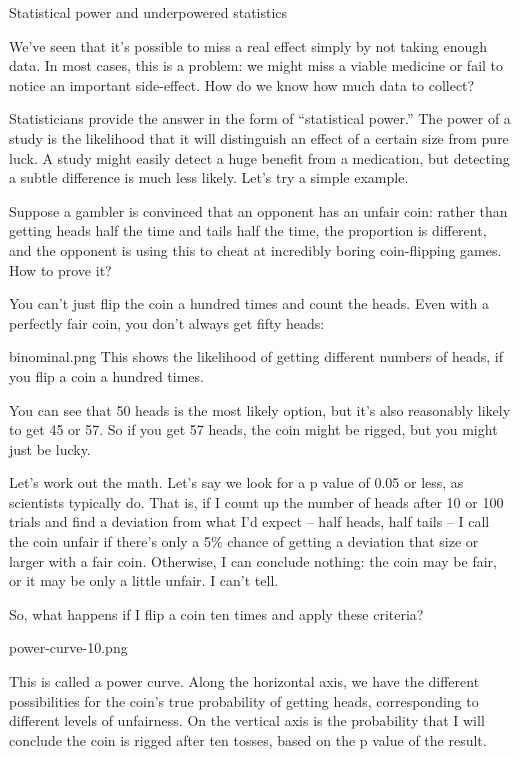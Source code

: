 Statistical power and underpowered statistics


We’ve seen that it’s possible to miss a real effect simply by not taking enough data. In most cases, this is a problem: we might miss a viable medicine or fail to notice an important side-effect. How do we know how much data to collect?

Statisticians provide the answer in the form of “statistical power.” The power of a study is the likelihood that it will distinguish an effect of a certain size from pure luck. A study might easily detect a huge benefit from a medication, but detecting a subtle difference is much less likely. Let’s try a simple example.

Suppose a gambler is convinced that an opponent has an unfair coin: rather than getting heads half the time and tails half the time, the proportion is different, and the opponent is using this to cheat at incredibly boring coin-flipping games. How to prove it?

You can’t just flip the coin a hundred times and count the heads. Even with a perfectly fair coin, you don’t always get fifty heads:


binominal.png
This shows the likelihood of getting different numbers of heads, if you flip a coin a hundred times.


You can see that 50 heads is the most likely option, but it’s also reasonably likely to get 45 or 57. So if you get 57 heads, the coin might be rigged, but you might just be lucky.

Let’s work out the math. Let’s say we look for a p value of 0.05 or less, as scientists typically do. That is, if I count up the number of heads after 10 or 100 trials and find a deviation from what I’d expect – half heads, half tails – I call the coin unfair if there’s only a 5\% chance of getting a deviation that size or larger with a fair coin. Otherwise, I can conclude nothing: the coin may be fair, or it may be only a little unfair. I can’t tell.

So, what happens if I flip a coin ten times and apply these criteria?



power-curve-10.png



This is called a power curve. Along the horizontal axis, we have the different possibilities for the coin’s true probability of getting heads, corresponding to different levels of unfairness. On the vertical axis is the probability that I will conclude the coin is rigged after ten tosses, based on the p value of the result.

